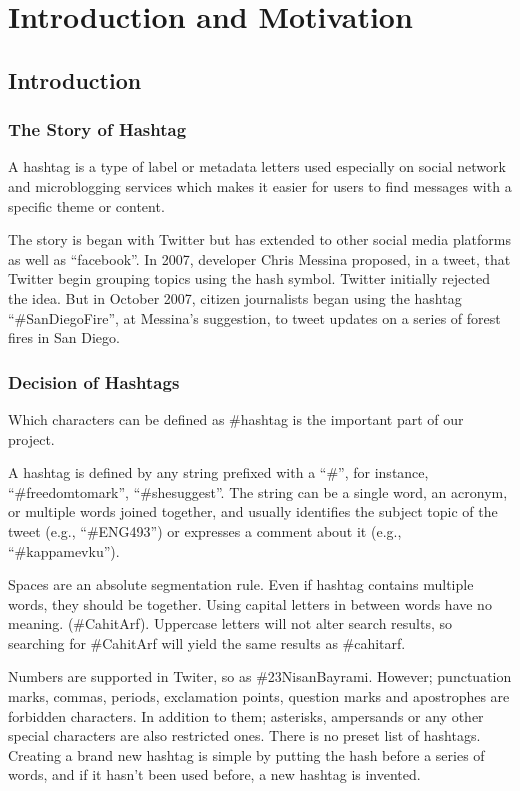 \documentclass[12pt]{comjnl}
\begin{document}
\maketitle
\section{Introduction and Motivation}
\subsection{Introduction}
\subsubsection{The Story of Hashtag}
A hashtag is a type of label or metadata letters used especially on social network and microblogging services which makes it easier for users to find messages with a specific theme or content.

The story is began with Twitter but has extended to other social media platforms as well as ``facebook''. In 2007, developer Chris Messina proposed, in a tweet, that Twitter begin grouping topics using the hash symbol. Twitter initially rejected the idea. But in October 2007, citizen journalists began using the hashtag ``\#SanDiegoFire'', at Messina’s suggestion, to tweet updates on a series of forest fires in San Diego.

\subsubsection{Decision of Hashtags}
Which characters can be defined as \#hashtag is the important part of our project.

A hashtag is defined by any string prefixed with a ``\#'', for instance, “\#freedomtomark”,
“\#shesuggest”. The string can be a single word, an acronym, or multiple words joined
together, and usually identifies the subject topic of the tweet (e.g., “\#ENG493”)
or expresses a comment about it (e.g., “\#kappamevku”).

Spaces are an absolute segmentation rule. Even if hashtag contains multiple words, they should be together. Using capital letters in between words have no meaning. (\#CahitArf). Uppercase letters will not alter search results, so searching for \#CahitArf will yield the same results as \#cahitarf.

Numbers are supported in Twiter, so as \#23NisanBayrami. However; punctuation marks, commas, periods, exclamation points, question marks and apostrophes are forbidden characters. In addition to them; asterisks, ampersands or any other special characters are also restricted ones.
There is no preset list of hashtags. Creating a brand new hashtag is simple by putting the hash before a series of words, and if it hasn't been used before, a new hashtag is invented.
\end{document}
